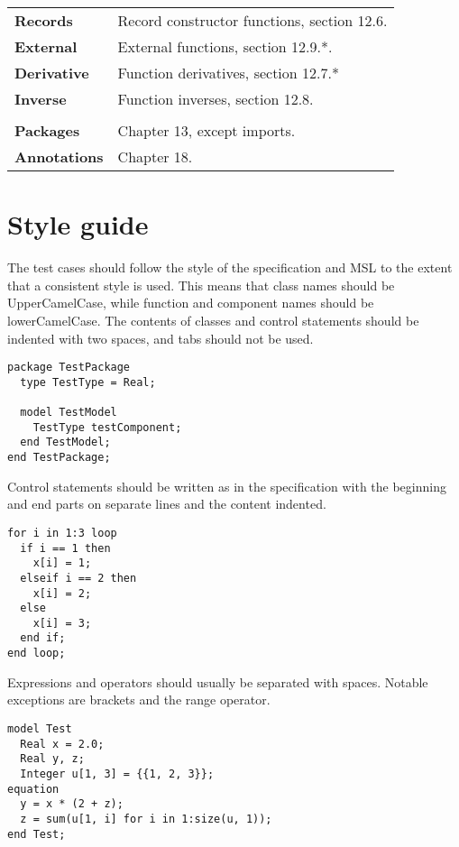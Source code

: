 \documentclass{article}
\begin{document}
\begin{tabular}{l l}
    \indent\textbf{Records}          & Record constructor functions, section 12.6. \\
    \indent\textbf{External}         & External functions, section 12.9.*. \\
    \indent\textbf{Derivative}       & Function derivatives, section 12.7.* \\
    \indent\textbf{Inverse}          & Function inverses, section 12.8. \\
  \\
  \textbf{Packages}                  & Chapter 13, except imports. \\
  \textbf{Annotations}               & Chapter 18. \\

\end{tabular}
\newpage
\section{Style guide}
The test cases should follow the style of the specification and MSL to the
extent that a consistent style is used. This means that class names should be
UpperCamelCase, while function and component names should be lowerCamelCase.
The contents of classes and control statements should be indented with two
spaces, and tabs should not be used.
\begin{lstlisting}[language=modelica]
package TestPackage
  type TestType = Real;

  model TestModel
    TestType testComponent;
  end TestModel;
end TestPackage;
\end{lstlisting}
Control statements should be written as in the specification with the beginning
and end parts on separate lines and the content indented.
\begin{lstlisting}[language=modelica]
for i in 1:3 loop
  if i == 1 then
    x[i] = 1;
  elseif i == 2 then
    x[i] = 2;
  else
    x[i] = 3;
  end if;
end loop;
\end{lstlisting}
Expressions and operators should usually be separated with spaces. Notable
exceptions are brackets and the range operator.
\begin{lstlisting}[language=modelica]
model Test
  Real x = 2.0;
  Real y, z;
  Integer u[1, 3] = {{1, 2, 3}};
equation
  y = x * (2 + z);
  z = sum(u[1, i] for i in 1:size(u, 1));
end Test;
\end{lstlisting}
\end{document}
